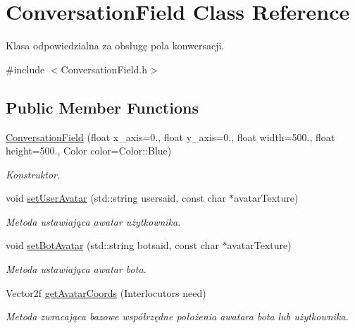 \hypertarget{class_conversation_field}{}\section{Conversation\+Field Class Reference}
\label{class_conversation_field}


Klasa odpowiedzialna za obsługę pola konwersacji.  




{\ttfamily \#include $<$Conversation\+Field.\+h$>$}

\subsection*{Public Member Functions}
\begin{DoxyCompactItemize}
\item 
\mbox{\hyperlink{class_conversation_field_a0c6e16a94dfb0c1abb0b2c476174a498}{Conversation\+Field}} (float x\+\_\+axis=0., float y\+\_\+axis=0., float width=500., float height=500., Color color=Color\+::\+Blue)
\begin{DoxyCompactList}\small\item\em Konstruktor. \end{DoxyCompactList}\item 
void \mbox{\hyperlink{class_conversation_field_a292ec090318762b21495ed18f21fb29c}{set\+User\+Avatar}} (std\+::string usersaid, const char $\ast$avatar\+Texture)
\begin{DoxyCompactList}\small\item\em Metoda ustawiająca awatar użytkownika. \end{DoxyCompactList}\item 
void \mbox{\hyperlink{class_conversation_field_addb47862af1b984d2fad2d03a1b180b6}{set\+Bot\+Avatar}} (std\+::string botsaid, const char $\ast$avatar\+Texture)
\begin{DoxyCompactList}\small\item\em Metoda ustawiająca awatar bota. \end{DoxyCompactList}\item 
Vector2f \mbox{\hyperlink{class_conversation_field_a32d5743cdda7853889f4fd198c8f8c55}{get\+Avatar\+Coords}} (Interlocutors need)
\begin{DoxyCompactList}\small\item\em Metoda zwracająca bazowe współrzędne położenia awatara bota lub użytkownika. \end{DoxyCompactList}\item 

\end{DoxyCompactItemize}
